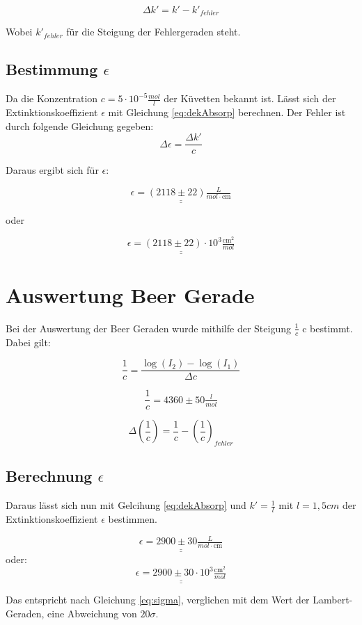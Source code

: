\begin{equation}
    \Delta k' = k' - k'_{fehler}
\end{equation}

Wobei $k'_{fehler}$ für die Steigung der Fehlergeraden steht.

\subsection{Bestimmung $\epsilon$}

Da die Konzentration $c = 5 \cdot 10^{-5} \tfrac{mol}{l}$ der Küvetten bekannt ist.
Lässt sich der Extinktionskoeffizient $\epsilon$ mit Gleichung \ref{eq:dekAbsorp} berechnen. Der Fehler ist durch folgende Gleichung gegeben:
\begin{equation}
    \Delta \epsilon = \frac{\Delta k'}{c}
\end{equation}

Daraus ergibt sich für $\epsilon$:

\[ \underline{\underline{\epsilon = (2118 \pm 22) \tfrac{L}{mol \cdot \text{cm}}}}\]

oder


\[ \underline{\underline{\epsilon =( 2118 \pm 22) \cdot 10^3\tfrac{\text{cm}^2}{mol}}}\]

\section{Auswertung Beer Gerade}

Bei der Auswertung der Beer Geraden wurde mithilfe der Steigung $\frac{1}{c}$ c
bestimmt. Dabei gilt:

\begin{equation}
    \frac{1}{c} = \frac{\log(I_2)-\log(I_1)}{\Delta c}
\end{equation}

\[ \frac{1}{c} = 4360 \pm 50 \tfrac{l}{mol}\]

\begin{equation}
    \Delta(\frac{1}{c}) = \frac{1}{c} - (\frac{1}{c})_{fehler}
\end{equation}

\subsection{Berechnung $\epsilon$}

Daraus lässt sich nun mit Gelcihung \ref{eq:dekAbsorp} und $k' = \frac{1}{l}$ mit $l = 1,5 cm$
der Extinktionskoeffizient $\epsilon$ bestimmen.

\[ \underline{\underline{\epsilon = 2900 \pm 30 \tfrac{L}{mol \cdot \text{cm}}}}\]
oder:
\[ \underline{\underline{\epsilon = 2900 \pm 30 \cdot 10^3\tfrac{\text{cm}^2}{mol}}}\]

Das entspricht nach Gleichung \ref{eq:sigma}, verglichen mit dem Wert der Lambert-Geraden, eine Abweichung von $20 \sigma$.

